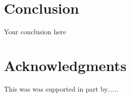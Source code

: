 \documentclass{article}
\begin{document}






\section{Conclusion}
Your conclusion here

\section*{Acknowledgments}
This was was supported in part by......

  
  
\end{document}
